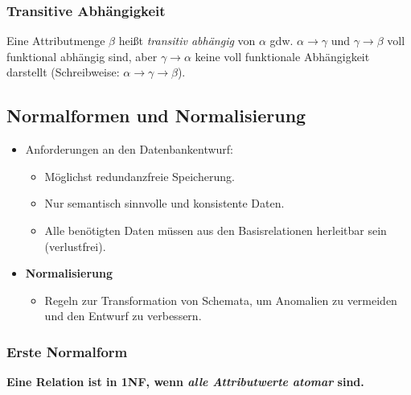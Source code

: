             \subsubsection{Transitive Abhängigkeit} %
                Eine Attributmenge \(\beta\) heißt \textit{transitiv abhängig} von \(\alpha\) gdw. \(\alpha \rightarrow \gamma\) und \(\gamma \rightarrow \beta\) voll funktional abhängig sind, aber \(\gamma \rightarrow \alpha\) keine voll funktionale Abhängigkeit darstellt (Schreibweise: \( \alpha \rightarrow \gamma \rightarrow \beta \)).

        \subsection{Normalformen und Normalisierung} %
            \begin{itemize}
            	\item Anforderungen an den Datenbankentwurf:
            		\begin{itemize}
            			\item Möglichst redundanzfreie Speicherung.
            			\item Nur semantisch sinnvolle und konsistente Daten.
            			\item Alle benötigten Daten müssen aus den Basisrelationen herleitbar sein (verlustfrei).
            		\end{itemize}
            	\item \textbf{Normalisierung}
            		\begin{itemize}
            			\item Regeln zur Transformation von Schemata, um Anomalien zu vermeiden und den Entwurf zu verbessern.
            		\end{itemize}
            \end{itemize}
        

            \subsubsection{Erste Normalform} %
            	\textbf{Eine Relation ist in 1NF, wenn \textit{alle Attributwerte atomar} sind.}
            	

